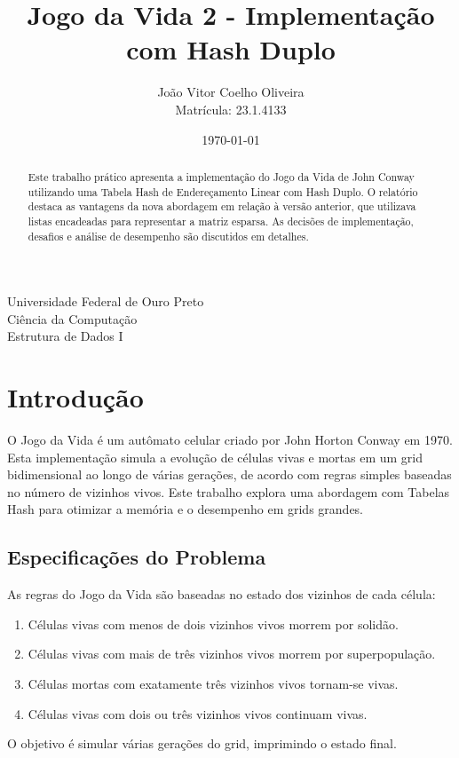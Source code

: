\documentclass[a4paper,12pt]{article}
\title{Jogo da Vida 2 - Implementação com Hash Duplo}
\author{João Vitor Coelho Oliveira \\ Matrícula: 23.1.4133}
\date{\today}
\begin{document}
\maketitle

\begin{center}
    Universidade Federal de Ouro Preto\\
    Ciência da Computação\\
    Estrutura de Dados I
\end{center}

\begin{abstract}
    Este trabalho prático apresenta a implementação do Jogo da Vida de John Conway utilizando uma Tabela Hash de Endereçamento Linear com Hash Duplo. O relatório destaca as vantagens da nova abordagem em relação à versão anterior, que utilizava listas encadeadas para representar a matriz esparsa. As decisões de implementação, desafios e análise de desempenho são discutidos em detalhes.
\end{abstract}

\section{Introdução}
O Jogo da Vida é um autômato celular criado por John Horton Conway em 1970. Esta implementação simula a evolução de células vivas e mortas em um grid bidimensional ao longo de várias gerações, de acordo com regras simples baseadas no número de vizinhos vivos. Este trabalho explora uma abordagem com Tabelas Hash para otimizar a memória e o desempenho em grids grandes.

\subsection{Especificações do Problema}
As regras do Jogo da Vida são baseadas no estado dos vizinhos de cada célula:
\begin{enumerate}
    \item Células vivas com menos de dois vizinhos vivos morrem por solidão.
    \item Células vivas com mais de três vizinhos vivos morrem por superpopulação.
    \item Células mortas com exatamente três vizinhos vivos tornam-se vivas.
    \item Células vivas com dois ou três vizinhos vivos continuam vivas.
\end{enumerate}

O objetivo é simular várias gerações do grid, imprimindo o estado final.
\end{document}
